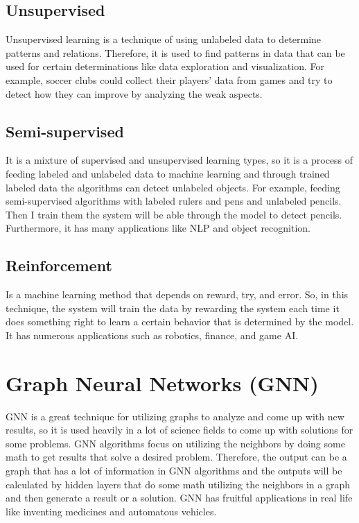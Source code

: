 \documentclass{article}
\begin{document}
\subsection{Unsupervised}
Unsupervised learning is a technique of using unlabeled data to determine patterns and relations. Therefore, it is used to find patterns in data that can be used for certain determinations like data exploration and visualization.  For example, soccer clubs could collect their players’ data from games and try to detect how they can improve by analyzing the weak aspects.

\subsection{Semi-supervised}
It is a mixture of supervised and unsupervised learning types, so it is a process of feeding labeled and unlabeled data to machine learning and through trained labeled data the algorithms can detect unlabeled objects. For example, feeding semi-supervised algorithms with labeled rulers and pens and unlabeled pencils. Then I train them the system will be able through the model to detect pencils. Furthermore, it has many applications like NLP and object recognition.

\subsection{Reinforcement}
Is a machine learning method that depends on reward, try, and error. So, in this technique, the system will train the data by rewarding the system each time it does something right to learn a certain behavior that is determined by the model. It has numerous applications such as robotics, finance, and game AI.
\section{Graph Neural Networks (GNN)}
GNN is a great technique for utilizing graphs to analyze and come up with new results, so it is used heavily in a lot of science fields to come up with solutions for some problems.  GNN algorithms focus on utilizing the neighbors by doing some math to get results that solve a desired problem. Therefore, the output can be a graph that has a lot of information in GNN algorithms and the outputs will be calculated by hidden layers that do some math utilizing the neighbors in a graph and then generate a result or a solution.  GNN has fruitful applications in real life like inventing medicines and automatous vehicles.

\cite{Distill1}
\cite{geeks1}
\cite{geeks2}
\cite{med}

\printbibliography
\end{document}
